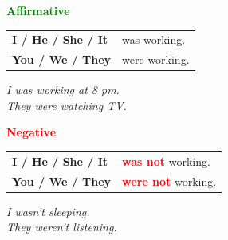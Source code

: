 \documentclass[a4paper,10pt]{article}
\newcommand{\sectiontitle}[2]{%
  {\large\bfseries\textcolor{#1}{#2}}%
}
\begin{document}
\begin{minipage}[t]{.485\textwidth}
\begin{greenbox}
  \sectiontitle{Green}{Affirmative}

  \vspace{0.75mm}
  \begin{tabular}{@{}>{\bfseries}l l@{}}
    I / He / She / It & was working.\\
    You / We / They & were working.
  \end{tabular}

  \vspace{0.75mm}
  \textit{I was working at 8 pm.}\\[-1mm]
  \textit{They were watching TV.}
\end{greenbox}
\end{minipage}
\hfill
\begin{minipage}[t]{.485\textwidth}
\begin{redbox}
  \sectiontitle{Red}{Negative}

  \vspace{0.75mm}
  \begin{tabular}{@{}>{\bfseries}l l@{}}
    I / He / She / It & \textcolor{Red}{\bfseries was not} working.\\
    You / We / They & \textcolor{Red}{\bfseries were not} working.
  \end{tabular}

  \vspace{0.75mm}
  \textit{I wasn't sleeping.}\\[-1mm]
  \textit{They weren't listening.}
\end{redbox}
\end{minipage}

\vspace{1.35mm}
\end{document}
